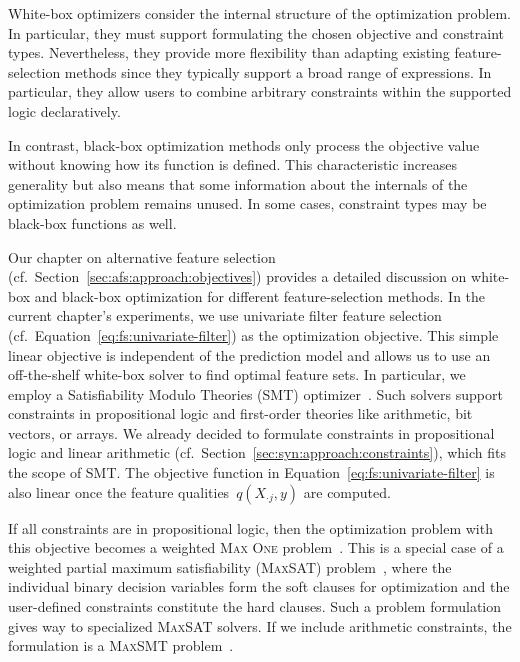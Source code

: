 White-box optimizers consider the internal structure of the optimization problem.
In particular, they must support formulating the chosen objective and constraint types.
Nevertheless, they provide more flexibility than adapting existing feature-selection methods since they typically support a broad range of expressions.
In particular, they allow users to combine arbitrary constraints within the supported logic declaratively.

In contrast, black-box optimization methods only process the objective value without knowing how its function is defined.
This characteristic increases generality but also means that some information about the internals of the optimization problem remains unused.
In some cases, constraint types may be black-box functions as well.

Our chapter on alternative feature selection (cf.~Section~\ref{sec:afs:approach:objectives}) provides a detailed discussion on white-box and black-box optimization for different feature-selection methods.
In the current chapter's experiments, we use univariate filter feature selection (cf.~Equation~\ref{eq:fs:univariate-filter}) as the optimization objective.
This simple linear objective is independent of the prediction model and allows us to use an off-the-shelf white-box solver to find optimal feature sets.
In particular, we employ a Satisfiability Modulo Theories (SMT) optimizer~\cite{barrett2018satisfiability}.
Such solvers support constraints in propositional logic and first-order theories like arithmetic, bit vectors, or arrays.
We already decided to formulate constraints in propositional logic and linear arithmetic (cf.~Section~\ref{sec:syn:approach:constraints}), which fits the scope of SMT.
The objective function in Equation~\ref{eq:fs:univariate-filter} is also linear once the feature qualities~$q(X_{\cdot{}j},y)$ are computed.

If all constraints are in propositional logic, then the optimization problem with this objective becomes a weighted \textsc{Max One} problem~\cite{khanna1997complete}.
This is a special case of a weighted partial maximum satisfiability (\textsc{MaxSAT}) problem~\cite{bacchus2021maximum, li2021maxsat}, where the individual binary decision variables form the soft clauses for optimization and the user-defined constraints constitute the hard clauses.
Such a problem formulation gives way to specialized \textsc{MaxSAT} solvers.
If we include arithmetic constraints, the formulation is a \textsc{MaxSMT} problem~\cite{nieuwenhuis2006sat}.

